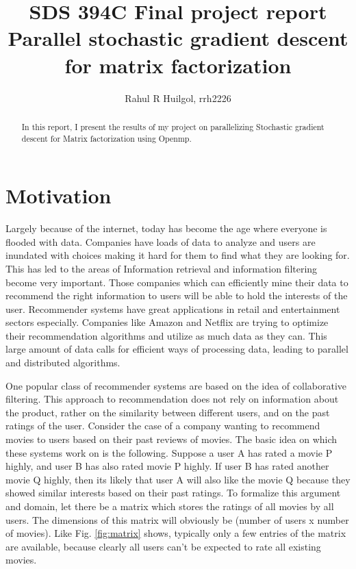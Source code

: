\documentclass[a4paper,11pt]{article}
\title{SDS 394C Final project report\\{\Large Parallel stochastic gradient descent for matrix factorization}}
\author{Rahul R Huilgol, rrh2226}
\begin{document}
\maketitle
\tableofcontents

\begin{abstract}
In this report, I present the results of my project on parallelizing Stochastic gradient descent for Matrix factorization using Openmp. 
\end{abstract}

\section{Motivation}
Largely because of the internet, today has become the age where everyone is flooded with data. Companies have loads of data to analyze and users are inundated with choices making it hard for them to find what they are looking for. This has led to the areas of Information retrieval and information filtering become very important. Those companies which can efficiently mine their data to recommend the right information to users will be able to hold the interests of the user. Recommender systems have great applications in retail and entertainment sectors especially. Companies like Amazon and Netflix are trying to optimize their recommendation algorithms and utilize as much data as they can. This large amount of data calls for efficient ways of processing data, leading to parallel and distributed algorithms.

One popular class of recommender systems are based on the idea of collaborative filtering. This approach to recommendation does not rely on information about the product, rather on the similarity between different users, and on the past ratings of the user. Consider the case of a company wanting to recommend movies to users based on their past reviews of movies. The basic idea on which these systems work on is the following. Suppose a user A has rated a movie P highly, and user B has also rated movie P highly. If user B has rated another movie Q highly, then its likely that user A will also like the movie Q because they showed similar interests based on their past ratings. To formalize this argument and domain, let there be a matrix which stores the ratings of all movies by all users. The dimensions of this matrix will obviously be (number of users x number of movies). Like Fig. \ref{fig:matrix} shows, typically only a few entries of the matrix are available, because clearly all users can't be expected to rate all existing movies.
\end{document}
